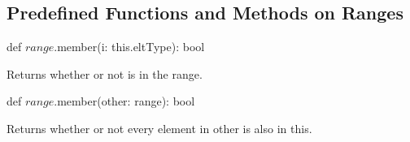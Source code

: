 \subsection{Predefined Functions and Methods on Ranges}

\begin{protohead}
def $range$.member(i: this.eltType): bool
\end{protohead}
\begin{protobody}
Returns whether or not  is in the range.
\end{protobody}

\begin{protohead}
def $range$.member(other: range): bool
\end{protohead}
\begin{protobody}
Returns whether or not every element in other is also in this.
\end{protobody}
